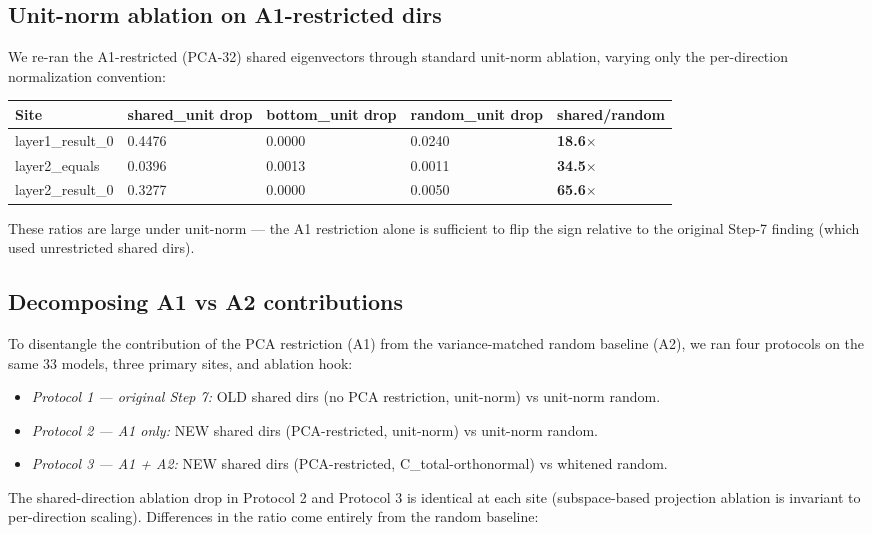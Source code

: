 \subsection{Unit-norm ablation on A1-restricted dirs}

We re-ran the A1-restricted (PCA-32) shared eigenvectors through standard
unit-norm ablation, varying only the per-direction normalization
convention:

\begin{center}
\begin{tabular}{|l|l|l|l|l|}
\hline
\textbf{Site} & \textbf{shared\_unit drop} & \textbf{bottom\_unit drop} & \textbf{random\_unit drop} & \textbf{shared/random} \\
\hline
layer1\_result\_0 & 0.4476 & 0.0000 & 0.0240 & \textbf{18.6$\times$} \\
layer2\_equals & 0.0396 & 0.0013 & 0.0011 & \textbf{34.5$\times$} \\
layer2\_result\_0 & 0.3277 & 0.0000 & 0.0050 & \textbf{65.6$\times$} \\
\hline
\end{tabular}
\end{center}


These ratios are large under unit-norm --- the A1 restriction alone is
sufficient to flip the sign relative to the original Step-7 finding (which
used unrestricted shared dirs).

\subsection{Decomposing A1 vs A2 contributions}

To disentangle the contribution of the PCA restriction (A1) from the
variance-matched random baseline (A2), we ran four protocols on the same
33 models, three primary sites, and ablation hook:

\begin{itemize}
  \item \emph{Protocol 1 --- original Step 7:} OLD shared dirs (no PCA restriction, unit-norm) vs unit-norm random.
  \item \emph{Protocol 2 --- A1 only:} NEW shared dirs (PCA-restricted, unit-norm) vs unit-norm random.
  \item \emph{Protocol 3 --- A1 + A2:} NEW shared dirs (PCA-restricted, C\_total-orthonormal) vs whitened random.
\end{itemize}

The shared-direction ablation drop in Protocol 2 and Protocol 3 is
identical at each site (subspace-based projection ablation is invariant
to per-direction scaling). Differences in the ratio come entirely from
the random baseline:

